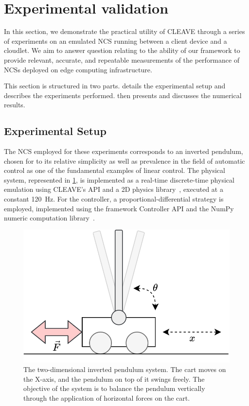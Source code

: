 \section{Experimental validation}\label{sec:experiments}



In this section, we demonstrate the practical utility of \ac{CLEAVE} through a series of experiments on an emulated \ac{NCS} running between a client device and a cloudlet.
We aim to answer question relating to the ability of our framework to provide relevant, accurate, and repeatable measurements of the performance of \acp{NCS} deployed on edge computing infrastructure.

This section is structured in two parts.
 details the experimental setup and describes the experiments performed.
 then presents and discusses the numerical results.

\subsection{Experimental Setup}\label{ssec:expsetup}

The \acl{NCS} employed for these experiments corresponds to an inverted pendulum, chosen for to its relative simplicity as well as prevalence in the field of automatic control as one of the fundamental examples of linear control.
The physical system, represented in \cref{fig:invpend}, is implemented as a real-time discrete-time physical emulation using CLEAVE's API and a 2D physics library~\autocite{chipmunk2d,pymunk}, executed at a constant \SI{120}{\hertz}.
For the controller, a proportional-differential strategy is employed, implemented using the framework Controller API and the NumPy numeric computation library~\autocite{harris2020array}.

\begin{figure}
    \centering
    \includegraphics[width=.95\columnwidth]{images/inverted_pendulum.png}
    \caption{
        The two-dimensional inverted pendulum system.
        The cart moves on the X-axis, and the pendulum on top of it swings freely.
        The objective of the system is to balance the pendulum vertically through the application of horizontal forces on the cart.
    }\label{fig:invpend}
\end{figure}

